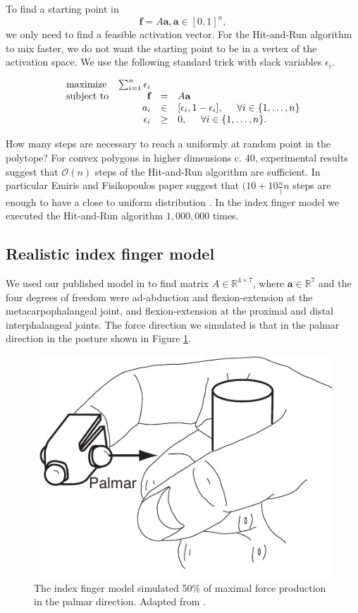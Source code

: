 To find a starting point in 
\[\textbf{f} = A\textbf{a}, \textbf{a} \in [0,1]^n,\]
we only need to find a feasible activation vector. For the Hit-and-Run algorithm to mix faster, we do not want the starting point to be in a vertex of the activation space. We use the following standard trick with slack variables $\epsilon_i$.

\begin{equation}\label{eq:LP_r}
\begin{array}{lrcl}
\mbox{maximize} & \sum_{i=1}^n \epsilon_i \\ 
\mbox{subject to} & \textbf{f} &=& A\textbf{a}\\
  & a_i &\in& [\epsilon_i, 1- \epsilon_i], \hspace{5mm} \forall i \in \{1,\dots,n\}  \\
  & \epsilon_i &\geq& 0, \hspace{5mm} \forall i \in \{1,\dots,n\}.  
\end{array}
\end{equation}

How many steps are necessary to reach a uniformly at random point in the polytope? For convex polygons in higher dimensions c. $40$, experimental results suggest that $\mathcal{O}(n)$ steps of the Hit-and-Run algorithm are sufficient. In particular Emiris and Fisikopoulos paper suggest that $(10 + 10\frac{n})n$ steps are enough to have a close to uniform distribution \cite{emiris2013efficient}.
In the index finger model we executed the Hit-and-Run algorithm $1,000,000$ times.

\subsection{Realistic index finger model}
\label{ss:finger}
We used our published model in \cite{Valero-Cuevas1998Large} to find matrix $A \in \mathbb{R}^{4 \times 7}$, where $\textbf{a} \in \mathbb{R}^7$ and the four degrees of freedom were ad-abduction and flexion-extension at the metacarpophalangeal joint, and flexion-extension at the proximal and distal interphalangeal joints. The force direction we simulated is that in the palmar direction in the posture shown in Figure \ref{fig:finger}.
\begin{figure}[htbp]
\centering
\includegraphics[width=7.5cm\textwidth]{sections/figs/finger.pdf}
\caption{The index finger model simulated 50\% of maximal force production in the palmar direction. Adapted from \cite{Valero-Cuevas1998Large}.}
\label{fig:finger}
\end{figure}



